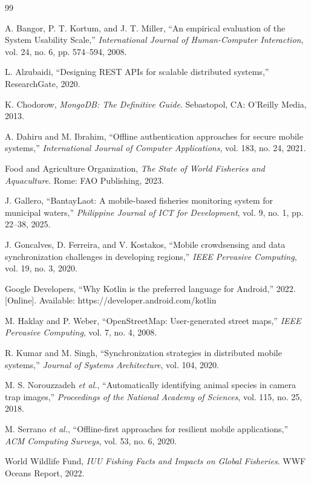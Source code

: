 \documentclass[journal]{IEEEtran}
\begin{document}
\begin{thebibliography}{99}

A. Bangor, P. T. Kortum, and J. T. Miller, ``An empirical evaluation of the System
Usability Scale,'' \textit{International Journal of Human-Computer Interaction},
vol. 24, no. 6, pp. 574--594, 2008.

L. Alzubaidi, ``Designing REST APIs for scalable distributed systems,'' ResearchGate,
2020.

K. Chodorow, \textit{MongoDB: The Definitive Guide}. Sebastopol, CA: O'Reilly Media,
2013.

A. Dahiru and M. Ibrahim, ``Offline authentication approaches for secure mobile
systems,'' \textit{International Journal of Computer Applications}, vol. 183, no. 24,
2021.

Food and Agriculture Organization, \textit{The State of World Fisheries and Aquaculture}.
Rome: FAO Publishing, 2023.

J. Gallero, ``BantayLaot: A mobile-based fisheries monitoring system for municipal
waters,'' \textit{Philippine Journal of ICT for Development}, vol. 9, no. 1,
pp. 22--38, 2025.

J. Goncalves, D. Ferreira, and V. Kostakos, ``Mobile crowdsensing and data
synchronization challenges in developing regions,'' \textit{IEEE Pervasive Computing},
vol. 19, no. 3, 2020.

Google Developers, ``Why Kotlin is the preferred language for Android,'' 2022.
[Online]. Available: https://developer.android.com/kotlin

M. Haklay and P. Weber, ``OpenStreetMap: User-generated street maps,''
\textit{IEEE Pervasive Computing}, vol. 7, no. 4, 2008.

R. Kumar and M. Singh, ``Synchronization strategies in distributed mobile systems,''
\textit{Journal of Systems Architecture}, vol. 104, 2020.

M. S. Norouzzadeh \textit{et al.}, ``Automatically identifying animal species in camera
trap images,'' \textit{Proceedings of the National Academy of Sciences}, vol. 115,
no. 25, 2018.

M. Serrano \textit{et al.}, ``Offline-first approaches for resilient mobile
applications,'' \textit{ACM Computing Surveys}, vol. 53, no. 6, 2020.

World Wildlife Fund, \textit{IUU Fishing Facts and Impacts on Global Fisheries}.
WWF Oceans Report, 2022.

\end{thebibliography}
\end{document}
